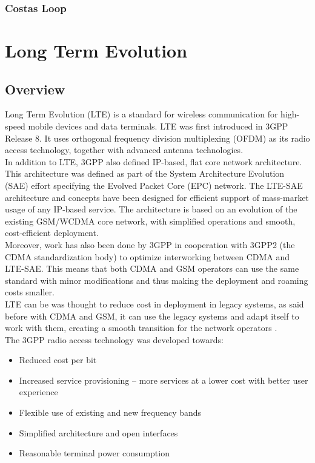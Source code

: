\subsubsection{Costas Loop}


\section{Long Term Evolution}
\label{let:lte}

\subsection{Overview}

Long Term Evolution (LTE) is a standard for wireless communication for high-speed
mobile devices and data terminals. LTE was first introduced in 3GPP Release 8.
It uses orthogonal frequency division multiplexing (OFDM) as its radio access
technology, together with advanced antenna technologies.\\

In addition to LTE, 3GPP also defined IP-based, flat core network architecture.
This architecture was defined as part of the System Architecture Evolution (SAE)
effort specifying the Evolved Packet Core (EPC) network. The LTE-SAE architecture
and concepts have been designed for efficient support of mass-market usage of any
IP-based service. The architecture is based on an evolution of the existing GSM/WCDMA
core network, with simplified operations and smooth, cost-efficient deployment.\\

Moreover, work has also been done by 3GPP in cooperation with 3GPP2 (the CDMA
standardization body) to optimize interworking between CDMA and LTE-SAE. This means
that both CDMA and GSM operators can use the same standard with minor modifications
and thus making the deployment and roaming costs smaller.\\

LTE can be was thought to reduce cost in deployment in legacy systems, as said
before with CDMA and GSM, it can use the legacy systems and adapt itself to work
with them, creating a smooth transition for the network operators \cite{introlte}.\\

The 3GPP radio access  technology was developed towards:

\begin{itemize}
    \item Reduced cost per bit
    \item Increased service provisioning – more services at a lower cost with
    better user experience
    \item Flexible use of existing and new frequency bands
    \item Simplified architecture and open interfaces
    \item Reasonable terminal power consumption
\end{itemize}

